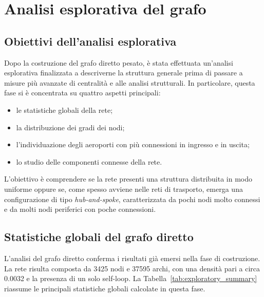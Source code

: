 \chapter{Analisi esplorativa del grafo}

\section{Obiettivi dell’analisi esplorativa}

Dopo la costruzione del grafo diretto pesato, è stata effettuata un’analisi esplorativa finalizzata a descriverne la struttura generale prima di passare a misure più avanzate di centralità e alle analisi strutturali. In particolare, questa fase si è concentrata su quattro aspetti principali:
\begin{itemize}
    \item le statistiche globali della rete;
    \item la distribuzione dei gradi dei nodi;
    \item l’individuazione degli aeroporti con più connessioni in ingresso e in uscita;
    \item lo studio delle componenti connesse della rete.
\end{itemize}

L’obiettivo è comprendere se la rete presenti una struttura distribuita in modo uniforme oppure se, come spesso avviene nelle reti di trasporto, emerga una configurazione di tipo \textit{hub-and-spoke}, caratterizzata da pochi nodi molto connessi e da molti nodi periferici con poche connessioni.

\section{Statistiche globali del grafo diretto}

L’analisi del grafo diretto conferma i risultati già emersi nella fase di costruzione. La rete risulta composta da 3425 nodi e 37595 archi, con una densità pari a circa 0.0032 e la presenza di un solo self-loop. La Tabella~\ref{tab:exploratory_summary} riassume le principali statistiche globali calcolate in questa fase.

